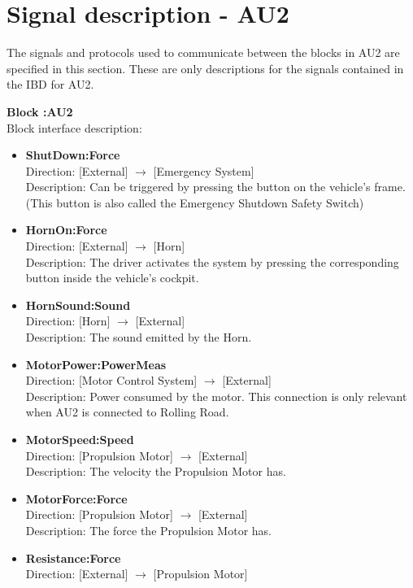 \section{Signal description - AU2}
The signals and protocols used to communicate between the blocks in AU2 are specified in this section. These are only descriptions for the signals contained in the IBD for AU2.

\textbf{Block :AU2}\\
Block interface description:
\begin{itemize}
	\item \textbf{ShutDown:Force}\\
	Direction: [External] $\rightarrow$ [Emergency System]\\
	Description: Can be triggered by pressing the button on the vehicle's frame. (This button is also called the Emergency Shutdown Safety Switch)	
	\item \textbf{HornOn:Force}\\
	Direction: [External] $\rightarrow$ [Horn]\\
	Description: The driver activates the system by pressing the corresponding button inside the vehicle's cockpit.
	\item \textbf{HornSound:Sound}\\
	Direction: [Horn] $\rightarrow$ [External]\\
	Description: The sound emitted by the Horn.
	\item \textbf{MotorPower:PowerMeas}\\
	Direction: [Motor Control System] $\rightarrow$ [External]\\
	Description: Power consumed by the motor. This connection is only relevant when AU2 is connected to Rolling Road. 
	\item \textbf{MotorSpeed:Speed}\\
	Direction: [Propulsion Motor] $\rightarrow$ [External]\\
	Description: The velocity the Propulsion Motor has.
	\item \textbf{MotorForce:Force}\\
	Direction: [Propulsion Motor] $\rightarrow$ [External]\\
	Description: The force the Propulsion Motor has. 
	\item \textbf{Resistance:Force}\\
	Direction: [External] $\rightarrow$ [Propulsion Motor]\\

\end{itemize}
